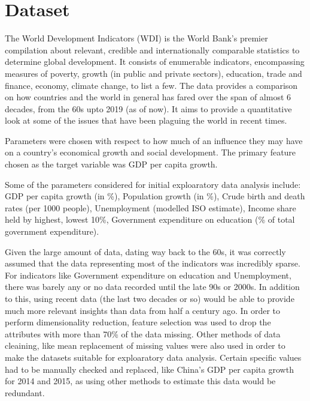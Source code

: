 \documentclass[conference]{IEEEtran}
\begin{document}
\section{Dataset}
The World Development Indicators (WDI) is the World Bank’s premier compilation 
about relevant, credible and internationally comparable statistics to determine 
global development. It consists of enumerable indicators, encompassing measures 
of poverty, growth (in public and private sectors), education, trade and finance, 
economy, climate change, to list a few. The data provides a comparison on how 
countries and the world in general has fared over the span of almost 6 decades, 
from the 60s upto 2019 (as of now). It aims to provide a quantitative look at 
some of the issues that have been plaguing the world in recent times.

Parameters were chosen with respect to how much of an influence they may have 
on a country's economical growth and social development. The primary feature chosen
as the target variable was GDP per capita growth.

Some of the parameters considered for initial exploaratory data analysis include: 
GDP per capita growth (in \%), 
Population growth (in \%), 
Crude birth and death rates (per 1000 people), 
Unemployment (modelled ISO estimate), 
Income share held by highest, lowest 10\%, 
Government expenditure on education (\% of total government expenditure).


Given the large amount of data, dating way back to the 60s, it was correctly assumed that the data representing most of the indicators was incredibly sparse. For indicators like Government expenditure on education and Unemployment, there was barely any or no data recorded until the late 90s or 2000s. In addition to this, using recent data (the last two decades or so) would be able to provide much more relevant insights than data from half a century ago. In order to perform dimensionality reduction, feature selection was used to drop the attributes with more than 
70\% of the data missing. Other methods of data cleaining, like mean replacement of missing values were also used in order to make the datasets suitable for exploaratory data analysis. Certain specific values had to be manually checked and replaced, like China's GDP per capita growth for 2014 and 2015, as using other methods to estimate this data would be redundant.
\end{document}
